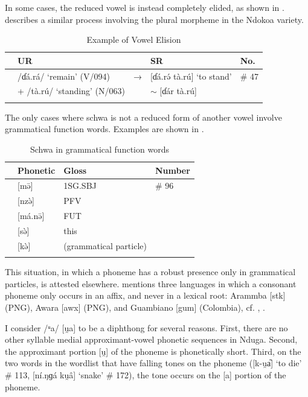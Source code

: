 \documentclass[output=paper,colorlinks,citecolor=brown
]{langscibook}
\begin{document}
In some cases, the reduced vowel is instead completely elided, as shown in . \citet[106]{mololi2011} describes a similar process involving the plural morpheme in the Ndokoa variety.

\begin{table}
\caption{Example of Vowel Elision}
\label{tab:olson:vowelelision}
 \begin{tabular}{lllll}
  \lsptoprule
          & UR & & SR & No. \\
  \midrule
& /ɗá.rá/ ‘remain’ (V/094) &
→ & [ɗá.rə́ tà.rú] ‘to stand’ & \# 47 \\
& + /tà.rú/ ‘standing’ (N/063) & & \(\sim \) [ɗár tà.rú] & \\
  \lspbottomrule
 \end{tabular}
\end{table}

The only cases where schwa is not a reduced form of another vowel involve grammatical function words. Examples are shown in .

\begin{table}
\caption{Schwa in grammatical function words}
\label{tab:olson:schwa}
 \begin{tabular}{llll}
  \lsptoprule
 & Phonetic & Gloss & Number \\
  \midrule
 & [mə̄]    & 1SG.SBJ & \# 96 \\
 & [nzə̀]   & PFV & \\
 & [má.nə̄] & FUT & \\
 & [sə̀]    & this & \\
 & [kə̀]    & (grammatical particle) & \\  
  \lspbottomrule
 \end{tabular}
\end{table}

This situation, in which a phoneme has a robust presence only in grammatical particles, is attested elsewhere. \citet{parker2009} mentions three languages in which a consonant phoneme only occurs in an affix, and never in a lexical root: Arammba [stk] (PNG), Awara [awx] (PNG), and Guambiano [gum] (Colombia), cf. \citet{quigley2003}, \citet{branks1973}.

I consider /ᵘa/ [u̯a] to be a diphthong for several reasons. First, there are no other syllable medial approximant-vowel phonetic sequences in Nduga. Second, the approximant portion [u̯] of the phoneme is phonetically short. Third, on the two words in the wordlist that have falling tones on the phoneme ([k-u̯a᷆] ‘to die’ \# 113, [ní.ŋɡá ku̯â] ‘snake’ \# 172), the tone occurs on the [a] portion of the phoneme.
\end{document}
